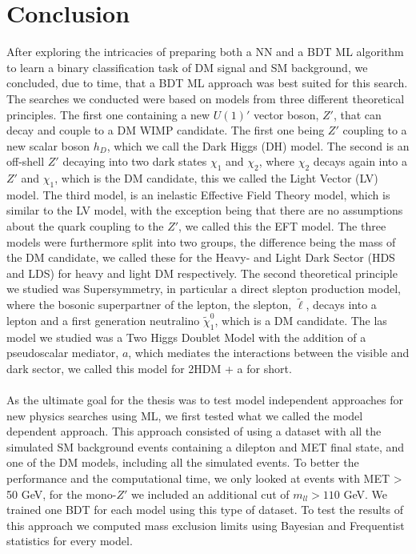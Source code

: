 \documentclass[12pt, a4paper]{book}
\begin{document}
\section{Conclusion}
After exploring the intricacies of preparing both a NN and a BDT ML algorithm to learn a binary classification task of DM signal and SM background, we concluded, due to time, that a BDT ML approach was 
best suited for this search. The searches we conducted were based on models from three different theoretical principles. The first one containing a new $U(1)'$ vector boson, $Z'$, that can decay and couple to a DM WIMP candidate. The first one being $Z'$ coupling to a new scalar boson $h_D$, 
which we call the Dark Higgs (DH) model. The second is an off-shell $Z'$ decaying into two dark states $\chi_1$ and $\chi_2$, where $\chi_2$ decays again into a $Z'$ and $\chi_1$, which is the DM candidate, this we called the Light Vector (LV) model. 
The third model, is an inelastic Effective Field Theory model, which is similar to the LV model, with the exception being that there are no assumptions about the quark coupling to the $Z'$, we called this the EFT model. The three models were furthermore 
split into two groups, the difference being the mass of the DM candidate, we called these for the Heavy- and Light Dark Sector (HDS and LDS) for heavy and light DM respectively. The second theoretical principle we studied was Supersymmetry, 
in particular a direct slepton production model, where the bosonic superpartner of the lepton, the slepton, $\tilde{\ell}$, decays into a lepton and a first generation neutralino $\tilde{\chi}_1^0$, which is a DM candidate. The las model we studied was 
a Two Higgs Doublet Model with the addition of a pseudoscalar mediator, $a$, which mediates the interactions between the visible and dark sector, we called this model for 2HDM + a for short.\\
\\As the ultimate goal for the thesis was to test model independent approaches for new physics searches using ML, we first tested what we called the model dependent approach. This approach consisted of using a dataset 
with all the simulated SM background events containing a dilepton and MET final state, and one of the DM models, including all the simulated events. 
To better the performance and the computational time, we only looked at events with MET > 50 GeV, for the mono-$Z'$ we included an additional cut of $m_{ll}>110$ GeV. We trained one BDT 
for each model using this type of dataset. To test the results of this approach we computed mass exclusion limits using Bayesian and Frequentist statistics for every model.\\
\end{document}
